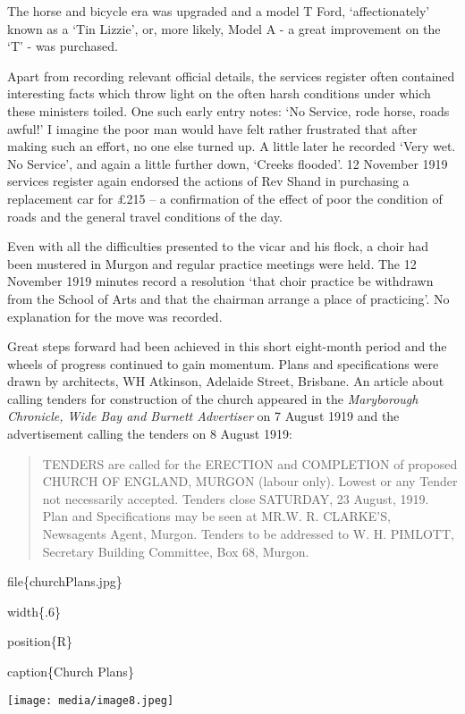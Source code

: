 The horse and bicycle era was upgraded and a model T Ford,
`affectionately' known as a `Tin Lizzie', or, more likely, Model A - a
great improvement on the `T' - was purchased.

Apart from recording relevant official details, the services register
often contained interesting facts which throw light on the often harsh
conditions under which these ministers toiled. One such early entry
notes: `No Service, rode horse, roads awful!' I imagine the poor man
would have felt rather frustrated that after making such an effort, no
one else turned up. A little later he recorded `Very wet. No Service',
and again a little further down, `Creeks flooded'. 12 November 1919
services register again endorsed the actions of Rev Shand in purchasing
a replacement car for £215 -- a confirmation of the effect of poor the
condition of roads and the general travel conditions of the day.

Even with all the difficulties presented to the vicar and his flock, a
choir had been mustered in Murgon and regular practice meetings were
held. The 12 November 1919 minutes record a resolution `that choir
practice be withdrawn from the School of Arts and that the chairman
arrange a place of practicing'. No explanation for the move was
recorded.

Great steps forward had been achieved in this short eight-month period
and the wheels of progress continued to gain momentum. Plans and
specifications were drawn by architects, WH Atkinson, Adelaide Street,
Brisbane. An article about calling tenders for construction of the
church appeared in the \emph{Maryborough Chronicle, Wide Bay and Burnett
Advertiser} on 7 August 1919 and the advertisement calling the tenders
on 8 August 1919:

\begin{quote}
TENDERS are called for the ERECTION and COMPLETION of proposed CHURCH OF
ENGLAND, MURGON (labour only). Lowest or any Tender not necessarily
accepted. Tenders close SATURDAY, 23 August, 1919. Plan and
Specifications may be seen at MR.W. R. CLARKE'S, Newsagents Agent,
Murgon. Tenders to be addressed to W. H. PIMLOTT, Secretary Building
Committee, Box 68, Murgon.
\end{quote}

file\{churchPlans.jpg\}

width\{.6\}

position\{R\}

caption\{Church Plans\}

\texttt{[image: media/image8.jpeg]}

